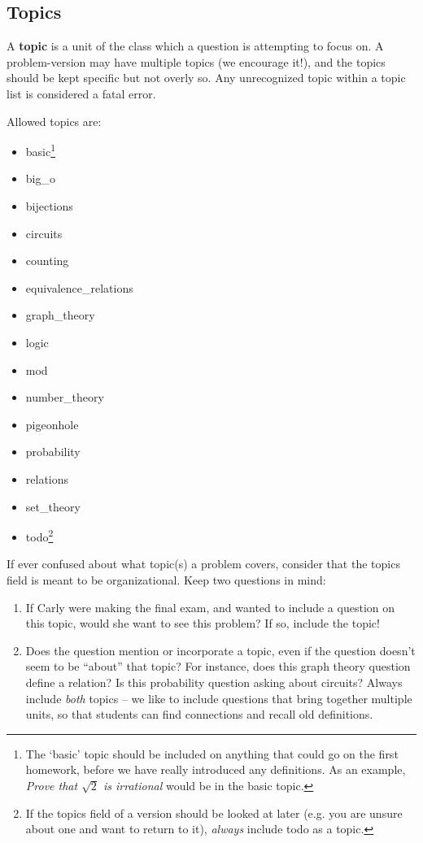  \subsection{Topics}
    A \textbf{topic} is a unit of the class which a question is attempting 
    to focus on. A problem-version may have multiple topics (we encourage 
    it!), and the topics should be kept specific but not overly so. Any 
    unrecognized topic within a topic list is considered a fatal error.
    
    Allowed topics are:
    \begin{itemize}\itemsep0pt
      \item basic\footnote{The `basic' topic should be included on 
      anything that could go on the first homework, before we have really 
      introduced any definitions. As an example, \textit{Prove that $\sqrt 
      2$ is irrational} would be in the basic topic.}
      \item big\_o
      \item bijections
      \item circuits
      \item counting
      \item equivalence\_relations
      \item graph\_theory
      \item logic
      \item mod
      \item number\_theory
      \item pigeonhole
      \item probability
      \item relations
      \item set\_theory
      \item todo\footnote{If the topics field of a version should be 
      looked at later (e.g. you are unsure about one and want to return to 
      it), \textit{always} include todo as a topic.}
    \end{itemize}
    
    If ever confused about what topic(s) a problem covers, consider that 
    the topics field is meant to be organizational. Keep two questions in mind:
    
    \begin{enumerate}[1.]\itemsep0pt
      \item If Carly were making the final exam, and wanted to include a 
      question on this topic, would she want to see this problem? If so, 
      include the topic!
      \item Does the question mention or incorporate a topic, even if the 
      question doesn't seem to be ``about'' that topic? For instance, does 
      this graph theory question define a relation? Is this probability 
      question asking about circuits? Always include \textit{both} topics 
      -- we like to include questions that bring together multiple units, 
      so that students can find connections and recall old definitions.
    \end{enumerate}
  
